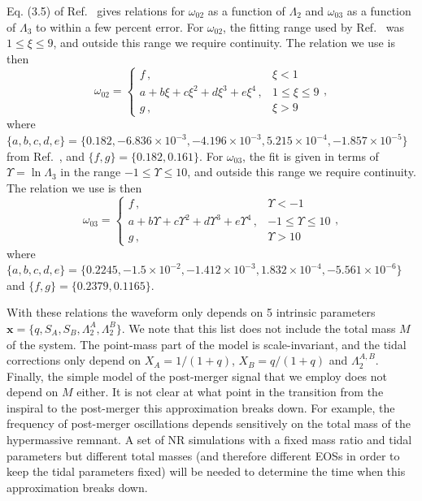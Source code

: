 \documentclass[prd,aps,letter,twocolumn,floatfix,notitlepage,nofootinbib]{revtex4-1}
\def\bx{\mathbf{x}}
\begin{document}
Eq. (3.5) of Ref.~\cite{Chan:2014kua} gives relations for $\omega_{02}$ as a function of $\Lambda_2$ and $\omega_{03}$ as a function of $\Lambda_3$ to within a few percent error. For $\omega_{02}$, the fitting range used by Ref.~\cite{Chan:2014kua} was $1\leq \xi \leq 9$, and outside this range we require continuity. The relation we use is then
\begin{equation}
\omega_{02} = \left\{\begin{array}{ll}
f\, , & \xi < 1 \\
a + b\xi + c\xi^2 + d\xi^3 + e\xi^4\, , & 1 \le \xi \le 9 \\
g\, , & \xi > 9
\end{array}\right.,
\end{equation}
where $\{a, b, c, d, e\} = \{0.182, -6.836\times10^{-3}, -4.196\times10^{-3}, 5.215\times10^{-4}, -1.857\times10^{-5}\}$ from Ref.~\cite{Chan:2014kua}, and $\{f, g\}=\{0.182, 0.161\}$. For $\omega_{03}$, the fit is given in terms of $\Upsilon=\ln\Lambda_3$ in the range $-1\leq \Upsilon \leq 10$, and outside this range we require continuity. The relation we use is then
\begin{equation}
\omega_{03} = \left\{\begin{array}{ll}
f\, , & \Upsilon < -1 \\
a + b\Upsilon + c\Upsilon^2 + d\Upsilon^3 + e\Upsilon^4\, , & -1 \le \Upsilon \le 10 \\
g\, , & \Upsilon > 10
\end{array}\right.,
\end{equation}
where $\{a, b, c, d, e\} = \{0.2245, -1.5\times10^{-2}, -1.412\times10^{-3}, 1.832\times10^{-4}, -5.561\times10^{-6}\}$ and $\{f, g\}=\{0.2379, 0.1165\}$.

With these relations the waveform only depends on 5 intrinsic parameters $\bx=\{q, S_A, S_B, \Lambda_2^A,\Lambda_2^B\}$. We note that this list does not include the total mass $M$ of the system. The point-mass part of the model is scale-invariant, and the tidal corrections only depend on $X_A=1/(1+q)$, $X_B=q/(1+q)$ and $\Lambda_2^{A,B}$. Finally, the simple model of the post-merger signal that we employ does not depend on $M$ either. It is not clear at what point in the transition from the inspiral to the post-merger this approximation breaks down. For example, the frequency of post-merger oscillations depends sensitively on the total mass of the hypermassive remnant. A set of NR simulations with a fixed mass ratio and tidal parameters but different total masses (and therefore different EOSs in order to keep the tidal parameters fixed) will be needed to determine the time when this approximation breaks down.
\end{document}
